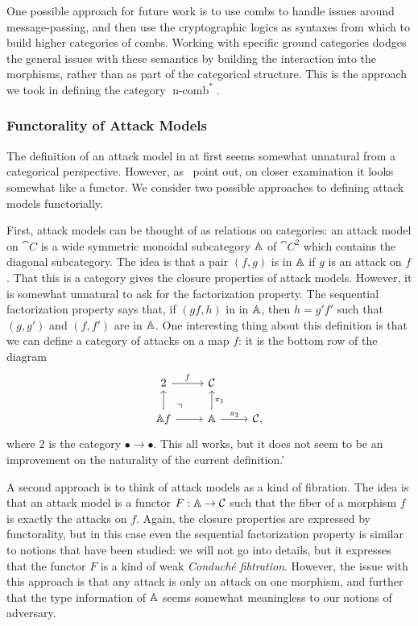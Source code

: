 One possible approach for future work is to use combs to handle issues around
message-passing, and then use the cryptographic logics as syntaxes from which to
build higher categories of combs. Working with specific ground categories dodges
the general issues with these semantics by building the interaction into the
morphisms, rather than as part of the categorical structure. This is the
approach we took in defining the category $\operatorname*{n-comb}^*$.

\subsubsection{Functorality of Attack Models}

The definition of an attack model in 
at first seems somewhat unnatural from a categorical perspective. However,
as~\cite{broadbent-karvonen-2022} point out, on closer examination it looks
somewhat like a functor. We consider two possible approaches to defining attack
models functorially.

First, attack models can be thought of as relations on categories: an attack
model on $\cat{C}$ is a wide symmetric monoidal subcategory $\AA$ of $\cat{C}^2$ which contains the
diagonal subcategory. The idea is that a pair $(f, g)$ is in $\AA$ if $g$ is an
attack on $f$. That this is a category gives the closure properties of attack
models. However, it is somewhat unnatural to ask for the factorization property.
The sequential factorization property says that, if $(gf, h)$ in in $\AA$, then
$h = g'f'$ such that $(g, g')$ and $(f, f')$ are in $\AA$. One interesting thing
about this definition is that we can define a category of attacks on a map $f$:
it is the bottom row of the diagram \[
  \begin{tikzcd}
    2\ar[r, "f"] & \cat{C} \\
    \AA f\ar[u]\ar[r]\ar[ur, phantom, "\urcorner", very near start] & \AA\ar[u,
    "\pi_1"']\ar[r, "\pi_2"] & \cat{C},
  \end{tikzcd}
\]where $2$ is the category $\bullet\to\bullet$. This all works, but
it does not seem to be an improvement on the naturality of the current
definition.'

A second approach is to think of attack models as a kind of fibration. The idea
is that an attack model is a functor $F: \AA\to\cat{C}$ such that the fiber of a
morphism $f$ is exactly the attacks on $f$. Again, the closure properties are
expressed by functorality, but in this case even the sequential factorization
property is similar to notions that have been studied: we will not go into
details, but it expresses that the functor $F$ is a kind of weak \emph{Conduché
fibtration}. However, the issue with this approach is that any attack is only an
attack on one morphism, and further that the type information of $\AA$ seems
somewhat meaningless to our notions of adversary.


